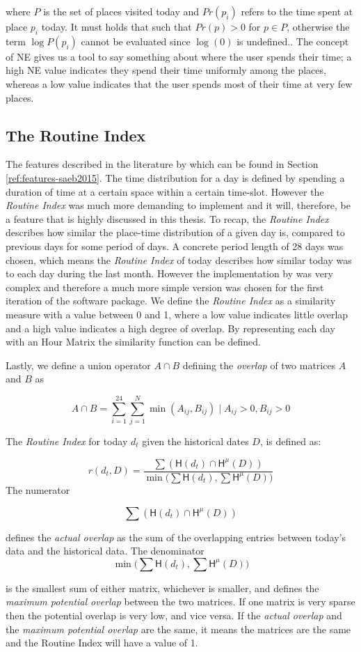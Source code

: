 where $P$ is the set of places visited today and $Pr(p_i)$ refers to the time spent at place $p_i$ today. It must holds that such that $Pr(p) > 0$ for $p \in P$, otherwise the term $\log P(p_i)$ cannot be evaluated since $\log(0)$ is undefined.. The concept of NE gives us a tool to say something about where the user spends their time; a high NE value indicates they spend their time uniformly among the places, whereas a low value indicates that the user spends most of their time at very few places. 

\subsection{The Routine Index}
The features described in the literature by \cite{Saeb2015} which can be found in Section \ref{ref:features-saeb2015}. The time distribution for a day is defined by spending a duration of time at a certain space within a certain time-slot.  However the \textit{Routine Index} \cite{Saeb2015, Canzian2015} was much more demanding to implement and it will, therefore, be a feature that is highly discussed in this thesis. To recap, the \textit{Routine Index} describes how similar the place-time distribution of a given day is, compared to previous days for some period of days. A concrete period length of 28 days was chosen, which means the \textit{Routine Index} of today describes how similar today was to each day during the last month. However the implementation by \cite{Canzian2015} was very complex and therefore a much more simple version was chosen for the first iteration of the software package. We define the \textit{Routine Index} as a similarity measure with a value between 0 and 1, where a low value indicates little overlap and a high value indicates a high degree of overlap. By representing each day with an Hour Matrix the similarity function can be defined.

Lastly, we define a union operator $A \cap B$ defining the \textit{overlap} of two matrices $A$ and $B$ as 

$$A \cap B = \sum_{i=1}^{24} \sum_{j=1}^{N} \min (A_{ij}, B_{ij}) \;|\; A_{ij} > 0, B_{ij} > 0$$

The \textit{Routine Index} for today $d_t$ given the historical dates $D$, is defined as: 

$$r(d_t, D) = \frac{\sum (\mathsf{H}(d_t) \cap \mathsf{H}^{\mu} (D) )}{\min \Big(\sum \mathsf{H}(d_t), \sum \mathsf{H}^{\mu} (D) \Big)}$$
The numerator 

$$\sum (\mathsf{H}(d_t) \cap \mathsf{H}^{\mu} (D) )$$

defines the \textit{actual overlap} as the sum of the overlapping entries between today's data and the historical data. The denominator 
$$\min \Big(\sum \mathsf{H}(d_t), \sum \mathsf{H}^{\mu} (D) \Big)$$ 

is the smallest sum of either matrix, whichever is smaller, and defines the \textit{maximum potential overlap} between the two matrices. If one matrix is very sparse then the potential overlap is very low, and vice versa. If the \textit{actual overlap} and the \textit{maximum potential overlap} are the same, it means the matrices are the same and the Routine Index will have a value of 1. 


